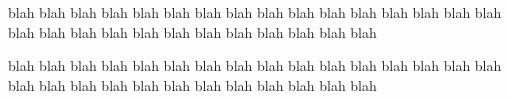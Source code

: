 \documentclass[11pt]{article}
\begin{document}
% 



% 
% 

% 
% 

% 

% 

% 

% 

% 

% 
% 

% 

% 
% 

% 
% 
% 


blah blah blah blah blah blah blah blah blah blah blah blah blah blah blah blah blah blah blah blah blah blah blah blah blah blah blah blah 

% 

blah blah blah blah blah blah blah blah blah blah blah blah blah blah blah blah blah blah blah blah blah blah blah blah blah blah blah blah 
\end{document}
